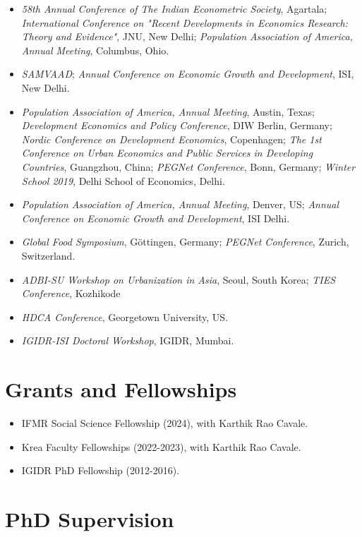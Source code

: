 \documentclass[10pt]{article}
\begin{document}
\begin{itemize}
\item[2024] \textit{58th Annual Conference of The Indian Econometric Society}, Agartala; \textit{International Conference on "Recent Developments in Economics Research: Theory and Evidence"}, JNU, New Delhi; \textit{Population Association of America, Annual Meeting}, Columbus, Ohio.
\item[2023] \textit{SAMVAAD}; \textit{Annual Conference on Economic Growth and Development}, ISI, New Delhi.
\item[2019] \textit{Population Association of America, Annual Meeting}, Austin, Texas; \textit{Development Economics and Policy Conference}, DIW Berlin, Germany; \textit{Nordic Conference on Development Economics}, Copenhagen; 
\textit{The 1st Conference on Urban Economics and Public Services in Developing Countries}, Guangzhou, China; \textit{PEGNet Conference}, Bonn, Germany; \textit{Winter School 2019}, Delhi School of Economics, Delhi. 
\item[2018] \textit{Population Association of America, Annual Meeting}, Denver, US; \textit{Annual Conference on Economic Growth and Development}, ISI Delhi.
\item[2017] \textit{Global Food Symposium}, G\"ottingen, Germany; \textit{PEGNet Conference}, Zurich, Switzerland.
\item[2016] \textit{ADBI-SU Workshop on Urbanization in Asia}, Seoul, South Korea; \textit{TIES Conference}, Kozhikode 
\item[2015] \textit{HDCA Conference}, Georgetown University, US.
\item[2014] \textit{IGIDR-ISI Doctoral Workshop}, IGIDR, Mumbai.

\end{itemize}

\section*{\sc Grants and Fellowships}

\begin{itemize}
\item IFMR Social Science Fellowship (2024), with Karthik Rao Cavale.
\item Krea Faculty Fellowships (2022-2023), with Karthik Rao Cavale.
\item IGIDR PhD Fellowship (2012-2016).
\end{itemize}

\section*{PhD Supervision}
\end{document}
